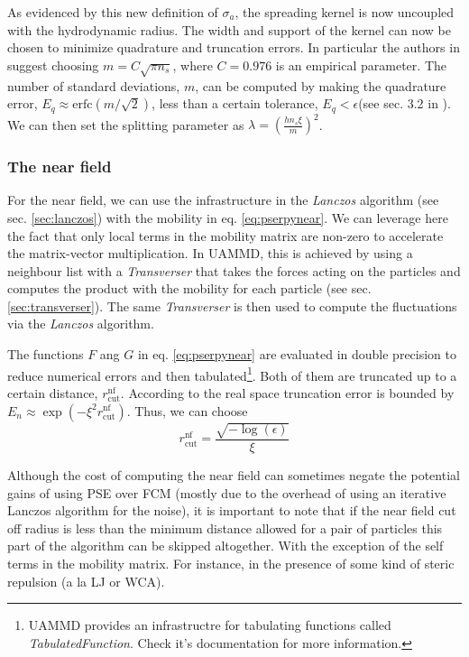 \documentclass[ twoside,openright,titlepage,numbers=noenddot,%
headinclude,footinclude,cleardoublepage=empty,abstract=on,
BCOR=5mm,paper=a4,fontsize=11pt, dvipsnames
]{scrreprt}
\newcommand{\uammd}{\gls{UAMMD}\xspace}
\begin{document}
As evidenced by this new definition of $\sigma_a$, the spreading kernel is now uncoupled with the hydrodynamic radius. The width and support of the kernel can now be chosen to minimize quadrature and truncation errors. In particular the authors in \cite{Lindbo2011} suggest choosing $m = C\sqrt{\pi n_s}$, where $C = 0.976$ is an empirical parameter. The number of standard deviations, $m$, can be computed by making the quadrature error, $E_q \approx \textrm{erfc}(m/\sqrt{2})$, less than a certain tolerance, $E_q<\epsilon$(see sec. 3.2 in \cite{Lindbo2011}). We can then set the splitting parameter as $\lambda = \left(\frac{hn_s\xi}{m}\right)^2$.

\subsubsection*{The near field}

For the near field, we can use the infrastructure in the \emph{Lanczos} algorithm (see sec. \ref{sec:lanczos}) with the mobility in eq. \eqref{eq:pserpynear}. We can leverage here the fact that only local terms in the mobility matrix are non-zero to accelerate the matrix-vector multiplication. In \uammd, this is achieved by using a neighbour list with a \emph{Transverser} that takes the forces acting on the particles and computes the product with the mobility for each particle (see sec. \ref{sec:transverser}). The same \emph{Transverser} is then used to compute the fluctuations via the \emph{Lanczos} algorithm.

The functions $F$ ang $G$ in eq. \eqref{eq:pserpynear} are evaluated in double precision to reduce numerical errors and then tabulated\footnote{\uammd provides an infrastructre for tabulating functions called \emph{TabulatedFunction}. Check it's documentation for more information.}. Both of them are truncated up to a certain distance, $r_{\textrm{cut}}^{\textrm{nf}}$. According to \cite{Lindbo2011} the real space truncation error is bounded by $E_n\approx \exp(-\xi^2r_{\textrm{cut}}^{\textrm{nf}})$. Thus, we can choose
\begin{equation}
r_{\textrm{cut}}^{\textrm{nf}} = \frac{\sqrt{-\log(\epsilon)}}{\xi}
\end{equation}

Although the cost of computing the near field can sometimes negate the potential gains of using \gls{PSE} over \gls{FCM} (mostly due to the overhead of using an iterative Lanczos algorithm for the noise), it is important to note that if the near field cut off radius is less than the minimum distance allowed for a pair of particles this part of the algorithm can be skipped altogether. With the exception of the self terms in the mobility matrix. For instance, in the presence of some kind of steric repulsion (a la \gls{LJ} or WCA).
\end{document}

